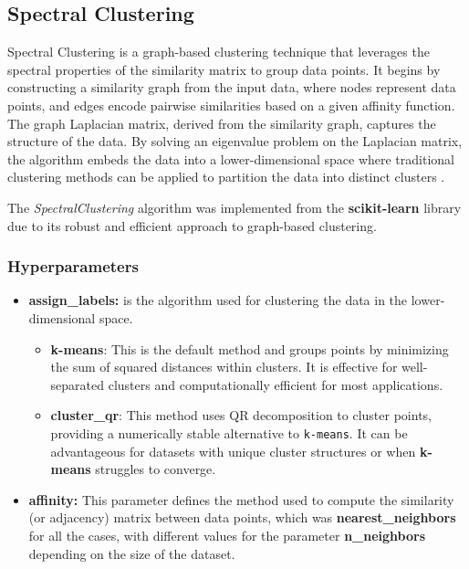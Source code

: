 \subsection{Spectral Clustering}
Spectral Clustering is a graph-based clustering technique that leverages the spectral properties of the similarity matrix
 to group data points. It begins by constructing a similarity graph from the input data, where nodes represent data points,
 and edges encode pairwise similarities based on a given affinity function. The graph Laplacian matrix, derived from the
 similarity graph, captures the structure of the data. By solving an eigenvalue problem on the Laplacian matrix, the
 algorithm embeds the data into a lower-dimensional space where traditional clustering methods can be applied to partition the
  data into distinct clusters \cite{spectral}. 


The \textit{SpectralClustering} algorithm was implemented from the \textbf{scikit-learn} library due to its robust and
 efficient approach to graph-based clustering.


 \subsubsection{Hyperparameters}
\begin{itemize}
  \item \textbf{assign\_labels:} is the algorithm used for clustering the data in the lower-dimensional space.
 \begin{itemize}
   \item \textbf{k-means}: This is the default method and groups points by minimizing the sum of squared distances within clusters. It is effective for well-separated clusters and computationally efficient for most applications.
   \item \textbf{cluster\_qr}: This method uses QR decomposition to cluster points, providing a numerically stable alternative to 
   \texttt{k-means}. It can be advantageous for datasets with unique cluster structures or when \textbf{k-means} struggles to
    converge.
\end{itemize}
\end{itemize}
\begin{itemize}
  \item \textbf{affinity:} This parameter defines the method used to compute the 
  similarity (or adjacency) matrix between data points, which was \textbf{nearest\_neighbors} 
  for all the cases, with different values for the parameter \textbf{n\_neighbors} depending on the size of the dataset.
\end{itemize}

